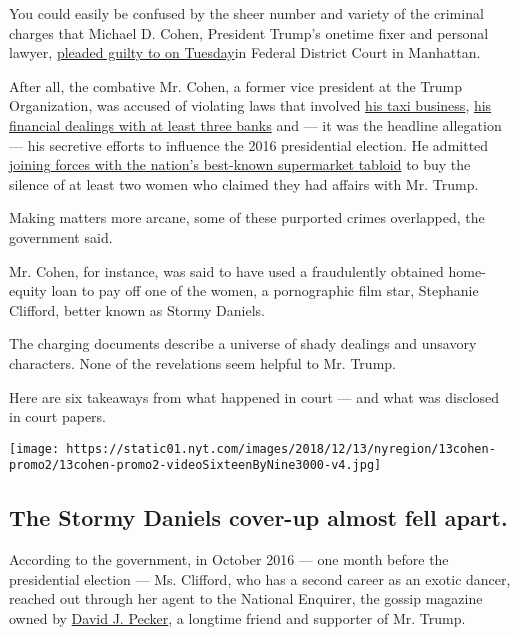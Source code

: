 You could easily be confused by the sheer number and variety of the
criminal charges that Michael D. Cohen, President Trump's onetime fixer
and personal lawyer,
\href{https://www.nytimes.com/2018/08/21/nyregion/michael-cohen-plea-deal-trump.html}{pleaded
guilty to on Tuesday}in Federal District Court in Manhattan.

After all, the combative Mr. Cohen, a former vice president at the Trump
Organization, was accused of violating laws that involved
\href{https://www.nytimes.com/2018/05/05/business/michael-cohen-lawyer-trump.html}{his
taxi business},
\href{https://www.nytimes.com/2018/08/19/nyregion/michael-cohen-loans-donald-trump.html}{his
financial dealings with at least three banks} and --- it was the
headline allegation --- his secretive efforts to influence the 2016
presidential election. He admitted
\href{https://www.nytimes.com/2018/04/11/us/politics/trump-national-enquirer-american-media.html}{joining
forces with the nation's best-known supermarket tabloid} to buy the
silence of at least two women who claimed they had affairs with Mr.
Trump.

Making matters more arcane, some of these purported crimes overlapped,
the government said.

Mr. Cohen, for instance, was said to have used a fraudulently obtained
home-equity loan to pay off one of the women, a pornographic film star,
Stephanie Clifford, better known as Stormy Daniels.

The charging documents describe a universe of shady dealings and
unsavory characters. None of the revelations seem helpful to Mr. Trump.

Here are six takeaways from what happened in court --- and what was
disclosed in court papers.

\texttt{[image: https://static01.nyt.com/images/2018/12/13/nyregion/13cohen-promo2/13cohen-promo2-videoSixteenByNine3000-v4.jpg]}

\hypertarget{the-stormy-daniels-cover-up-almost-fell-apart}{%
\subsection{The Stormy Daniels cover-up almost fell
apart.}\label{the-stormy-daniels-cover-up-almost-fell-apart}}

According to the government, in October 2016 --- one month before the
presidential election --- Ms. Clifford, who has a second career as an
exotic dancer, reached out through her agent to the National Enquirer,
the gossip magazine owned by
\href{https://www.nytimes.com/2018/03/29/us/politics/trump-national-enquirer-david-pecker.html}{David
J. Pecker}, a longtime friend and supporter of Mr. Trump.

